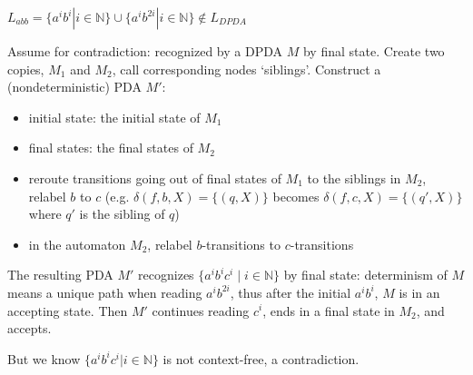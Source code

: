\documentclass[handout]{beamer}
\begin{document}
\begin{frame}{$L_{abb}=\{a^ib^i|i \in \mathbb{N}\} \cup \{a^ib^{2i}|i \in \mathbb{N}\}\notin L_{DPDA}$}

    \vspace{-3pt}
    Assume for contradiction: recognized by a DPDA $M$ by final state.
    Create two copies, $M_1$ and $M_2$, call corresponding nodes `siblings'. Construct a (nondeterministic) PDA $M'$:
    
    \vspace{-3pt}
    \begin{itemize}
        \item initial state: the initial state of $M_1$
        \item final states: the final states of $M_2$
        \item \alert{reroute transitions} going out of final states of $M_1$ to the siblings in $M_2$, relabel $b$ to $c$ (e.g. $\delta(f,b,X)=\{(q,X)\}$ becomes $\delta(f,c,X)=\{(q',X)\}$ where $q'$ is the sibling of $q$)
        \item in the automaton $M_2$, \alert{relabel} $b$-transitions to $c$-transitions 
    \end{itemize}

    \vspace{-3pt}
    The resulting PDA $M'$ recognizes \alert{$\{a^ib^ic^i\mid i \in \mathbb{N}\}$} by final state: determinism of $M$ means a \alert{unique path} when reading $a^ib^{2i}$, thus after the initial $a^ib^i$, $M$ is in an accepting state. Then $M'$ continues reading $c^i$, ends in a final state in $M_2$, and accepts.

    But we know $\{a^ib^ic^i|i \in \mathbb{N}\}$ is not context-free, a contradiction.\hfill\qedsymbol

\end{frame}
\end{document}
